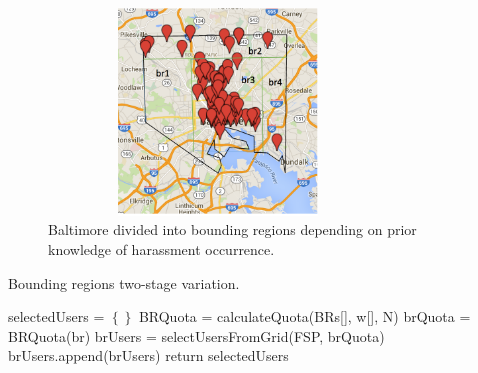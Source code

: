 \documentclass{acm_proc_article-sp}
\begin{document}
\begin{figure}[!h]
\centering
\includegraphics[width=9cm ,height=5.5cm]{figuresPng/BaltimoreBr.png}
\caption{Baltimore divided into bounding regions depending on prior knowledge of harassment occurrence.}
\label{fig: BaltimoreRegions}
\end{figure}


\begin{algorithm}
\caption{Bounding regions two-stage variation.}
\label{TSBR}
\begin{algorithmic}[1]
  \State selectedUsers = $\left\{\right\}$
   \State BRQuota = calculateQuota(BRs[], w[], N)
    \State brQuota = BRQuota(br)
  \State brUsers = selectUsersFromGrid(FSP, brQuota)
  \State brUsers.append(brUsers)
\EndFor
\State return {selectedUsers}
\EndFunction
\end{algorithmic}
\end{algorithm}
\end{document}
